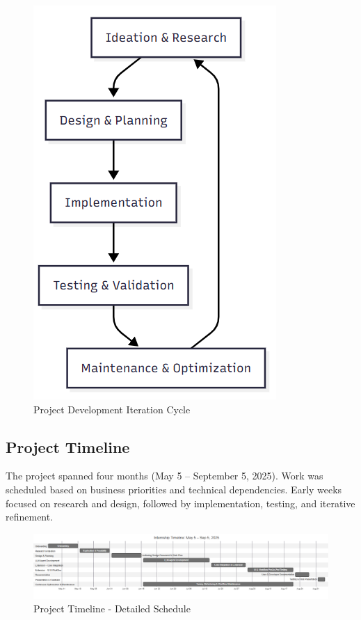 \begin{spacing}{1.2}
\begin{figure}[H]
    \centering
    \includegraphics[scale=0.8]{Images/dev_process.png}
    \caption{Project Development Iteration Cycle}
    \label{fig:development_cycle}
\end{figure}

\subsection{Project Timeline}
The project spanned four months (May 5 – September 5, 2025). Work was scheduled based on business priorities and technical dependencies. Early weeks focused on research and design, followed by implementation, testing, and iterative refinement.

\newpage
\begin{landscape}
\vspace*{\fill}
\begin{figure}[!ht]
    \centering
    \includegraphics[width=1.3\textwidth,height=0.9\textheight,keepaspectratio]{Images/project_timeline.png}
    \caption{Project Timeline - Detailed Schedule}
    \label{fig:project_timeline}
\end{figure}
\vspace*{\fill}
\end{landscape}
\newpage



\end{spacing}

